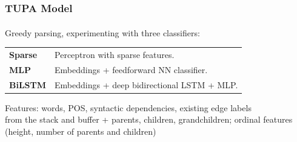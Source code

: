 \documentclass[t]{beamer}
\newcommand{\parser}[1]{TUPA\textsubscript{#1}}
\begin{document}
\begin{frame}
\frametitle{\parser{} Model}
Greedy parsing, experimenting with three classifiers:
\begin{flushleft}
	\begin{tabular}{ll}
	\textbf{Sparse} & Perceptron with sparse features. \\
	\textbf{MLP} & Embeddings + feedforward NN classifier. \\
	\textbf{BiLSTM} & Embeddings + deep bidirectional LSTM + MLP.
	\end{tabular}
	\vfill
	Features:
	words, POS, syntactic dependencies, existing edge labels \\
	from the stack and buffer + parents, children, grandchildren;
	ordinal features (height, number of parents and children)
\end{flushleft}
\end{frame}
\end{document}
